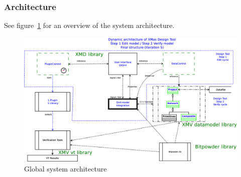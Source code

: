 \subsubsection{Architecture}

See figure~\ref{fig:global-system-architecture} for an overview
of the system architecture.

\begin{figure}[ht]
    \includegraphics[width=\textwidth]{1c-architecture-dynamic-2}
    \caption{Global system architecture}
    \label{fig:global-system-architecture}
\end{figure}
